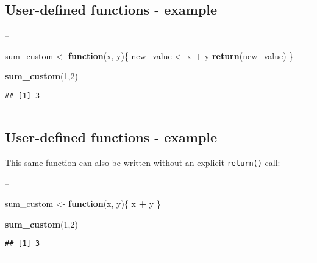 \documentclass[]{article}
\newenvironment{Shaded}{\begin{snugshade}}{\end{snugshade}}
\newcommand{\ControlFlowTok}[1]{\textcolor[rgb]{0.13,0.29,0.53}{\textbf{#1}}}
\newcommand{\DecValTok}[1]{\textcolor[rgb]{0.00,0.00,0.81}{#1}}
\newcommand{\KeywordTok}[1]{\textcolor[rgb]{0.13,0.29,0.53}{\textbf{#1}}}
\newcommand{\NormalTok}[1]{#1}
\newcommand{\OperatorTok}[1]{\textcolor[rgb]{0.81,0.36,0.00}{\textbf{#1}}}
\newcommand{\StringTok}[1]{\textcolor[rgb]{0.31,0.60,0.02}{#1}}
\begin{document}
\hypertarget{user-defined-functions---example}{%
\subsection{User-defined functions -
example}\label{user-defined-functions---example}}

--

\begin{Shaded}
\begin{Highlighting}[]
\NormalTok{sum_custom <-}\StringTok{ }\ControlFlowTok{function}\NormalTok{(x, y)\{}
\NormalTok{  new_value <-}\StringTok{ }\NormalTok{x }\OperatorTok{+}\StringTok{ }\NormalTok{y}
  \KeywordTok{return}\NormalTok{(new_value)}
\NormalTok{\}}

\KeywordTok{sum_custom}\NormalTok{(}\DecValTok{1}\NormalTok{,}\DecValTok{2}\NormalTok{)}
\end{Highlighting}
\end{Shaded}

\begin{verbatim}
## [1] 3
\end{verbatim}

\begin{center}\rule{0.5\linewidth}{\linethickness}\end{center}

\hypertarget{user-defined-functions---example-1}{%
\subsection{User-defined functions -
example}\label{user-defined-functions---example-1}}

This same function can also be written without an explicit
\texttt{return()} call:

--

\begin{Shaded}
\begin{Highlighting}[]
\NormalTok{sum_custom <-}\StringTok{ }\ControlFlowTok{function}\NormalTok{(x, y)\{}
\NormalTok{  x }\OperatorTok{+}\StringTok{ }\NormalTok{y}
\NormalTok{\}}

\KeywordTok{sum_custom}\NormalTok{(}\DecValTok{1}\NormalTok{,}\DecValTok{2}\NormalTok{)}
\end{Highlighting}
\end{Shaded}

\begin{verbatim}
## [1] 3
\end{verbatim}

\begin{center}\rule{0.5\linewidth}{\linethickness}\end{center}
\end{document}
